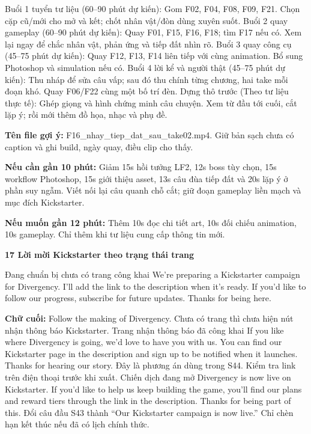 \documentclass[10pt,a4paper]{article}
\begin{document}
Buổi 1 tuyển tư liệu (60–90 phút dự kiến): Gom F02, F04, F08, F09, F21. Chọn cặp cũ/mới cho mở và kết; chốt nhân vật/đòn dùng xuyên suốt. Buổi 2 quay gameplay (60–90 phút dự kiến): Quay F01, F15, F16, F18; tìm F17 nếu có. Xem lại ngay để chắc nhân vật, phản ứng và tiếp đất nhìn rõ. Buổi 3 quay công cụ (45–75 phút dự kiến): Quay F12, F13, F14 liên tiếp với cùng animation. Bổ sung Photoshop và simulation nếu có. Buổi 4 lời kể và người thật (45–75 phút dự kiến): Thu nháp để sửa câu vấp; sau đó thu chính từng chương, hai take mỗi đoạn khó. Quay F06/F22 cùng một bố trí đèn. Dựng thô trước (Theo tư liệu thực tế): Ghép giọng và hình chứng minh câu chuyện. Xem từ đầu tới cuối, cắt lặp ý; rồi mới thêm đồ họa, nhạc và phụ đề.\par

\textbf{Tên file gợi ý:}  F16\_nhay\_tiep\_dat\_sau\_take02.mp4. Giữ bản sạch chưa có caption và ghi build, ngày quay, điều clip cho thấy.\par

\textbf{Nếu cần gần 10 phút:}  Giảm 15s hồi tưởng LF2, 12s boss tùy chọn, 15s workflow Photoshop, 15s giới thiệu asset, 13s câu đùa tiếp đất và 20s lặp ý ở phần suy ngẫm. Viết nối lại câu quanh chỗ cắt; giữ đoạn gameplay liền mạch và mục đích Kickstarter.\par

\textbf{Nếu muốn gần 12 phút:}  Thêm 10s đọc chi tiết art, 10s đối chiếu animation, 10s gameplay. Chỉ thêm khi tư liệu cung cấp thông tin mới.\par

\textbf{17 Lời mời Kickstarter theo trạng thái trang}\par

Đang chuẩn bị chưa có trang công khai We’re preparing a Kickstarter campaign for Divergency. I’ll add the link to the description when it’s ready. If you’d like to follow our progress, subscribe for future updates. Thanks for being here.\par

\textbf{Chữ cuối:}  Follow the making of Divergency. Chưa có trang thì chưa hiện nút nhận thông báo Kickstarter. Trang nhận thông báo đã công khai If you like where Divergency is going, we’d love to have you with us. You can find our Kickstarter page in the description and sign up to be notified when it launches. Thanks for hearing our story. Đây là phương án dùng trong S44. Kiểm tra link trên điện thoại trước khi xuất. Chiến dịch đang mở Divergency is now live on Kickstarter. If you’d like to help us keep building the game, you’ll find our plans and reward tiers through the link in the description. Thanks for being part of this. Đổi câu đầu S43 thành “Our Kickstarter campaign is now live.” Chỉ chèn hạn kết thúc nếu đã có lịch chính thức.\par
\end{document}

